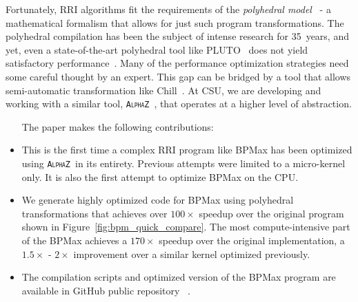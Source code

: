 \documentclass[conference]{IEEEtran}
\newcommand{\alphaz}{\textsc{\texttt{AlphaZ}}}
\begin{document}
Fortunately, RRI algorithms fit the requirements of the \emph{polyhedral model}~\cite{sanjay-fst-tcs, quinton-jvsp89, feautrier91, feautrier92a, feautrier92b}  - a mathematical formalism that allows for just such program transformations.  The polyhedral compilation has been the subject of intense research for 35~years, and yet, even a state-of-the-art polyhedral tool like PLUTO~\cite{Bondhugula2015PLuToAP, Bondhugula2008} does not yield satisfactory performance~\cite{Varadarajan2016}. Many of the performance optimization strategies need some careful thought by an expert.  This gap can be bridged by a tool that allows semi-automatic transformation like Chill~\cite{Chen08chill:a}. At CSU, we are developing and working with a similar tool, \alphaz~\cite{sanjay-lcpc2012}, that operates at a higher level of abstraction.
\begin{itemize}[wide, nosep, labelindent = 0pt]
\item [The paper makes the following contributions:]
\item This is the first time a complex RRI program like BPMax has been optimized using \alphaz\ in its entirety. Previous attempts were limited to a micro-kernel only. It is also the first attempt to optimize BPMax on the CPU.
\item We generate highly optimized code for BPMax using polyhedral transformations that achieves over $100\times$ speedup over the original program shown in Figure~\ref{fig:bpm_quick_compare}. The most compute-intensive part of the BPMax achieves a $170\times$ speedup over the original implementation, a  $1.5\times$ - $2\times$ improvement over a similar kernel optimized previously. 
\item The compilation scripts and optimized version of the BPMax program are available in GitHub public repository ~\cite{MondalBPMax}.
\end{itemize}
\end{document}
